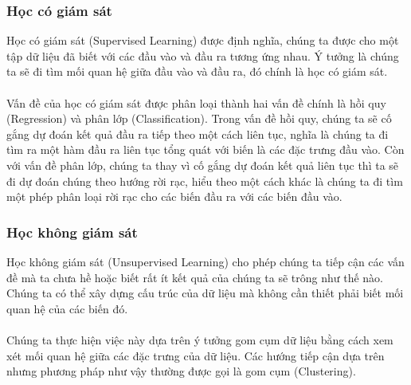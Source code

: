 \subsubsection{Học có giám sát}
Học có giám sát (Supervised Learning) được định nghĩa, chúng ta được cho một 
tập dữ liệu đã biết với các đầu vào và đầu ra tương ứng nhau. Ý tưởng là chúng 
ta sẽ đi tìm mối quan hệ giữa đầu vào và đầu ra, đó chính là học có giám sát.\\\\
Vấn đề của học có giám sát được phân loại thành hai
vấn đề chính là hồi quy (Regression) và phân lớp (Classification). Trong vấn đề 
hồi quy, chúng ta sẽ cố gắng dự đoán kết quả đầu ra tiếp theo một cách liên tục, 
nghĩa là chúng ta đi tìm ra một hàm đầu ra liên tục tổng quát với biến là các 
đặc trưng đầu vào. Còn với vấn đề phân lớp, chúng ta thay vì cố gắng dự đoán kết
quả liên tục thì ta sẽ đi dự đoán chúng theo hướng rời rạc, hiểu theo một cách
khác là chúng ta đi tìm một phép phân loại rời rạc cho các biến đầu ra với các 
biến đầu vào.
\subsubsection{Học không giám sát}
Học không giám sát (Unsupervised Learning) cho phép chúng ta tiếp cận các vấn 
đề mà ta chưa hề hoặc biết rất ít kết quả của chúng ta sẽ trông như thế nào. 
Chúng ta có thể xây dựng cấu trúc của dữ liệu mà không cần thiết phải biết mối 
quan hệ của các biến đó.\\\\
Chúng ta thực hiện việc này dựa trên ý tưởng gom cụm dữ liệu bằng cách xem xét
mối quan hệ giữa các đặc trưng của dữ liệu. Các hướng tiếp cận dựa trên nhưng 
phương pháp như vậy thường được gọi là gom cụm (Clustering).
